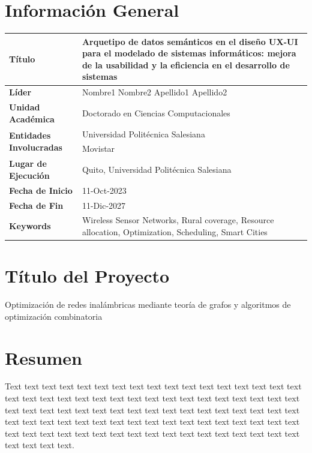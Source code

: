 \documentclass[12pt,a4paper]{article}
\begin{document}

\section{Información General}\label{sec:GeneralInformation}
\begin{table}[ht!]
\centering
\begin{tabular}{p{4cm}|p{9cm}}
\hline
\textbf{Título}  & 
Arquetipo de datos semánticos en el diseño UX-UI para el modelado de sistemas informáticos: mejora de la usabilidad y la eficiencia en el desarrollo de sistemas   \\
\hline
\textbf{Líder} & Nombre1 Nombre2 Apellido1 Apellido2 \\
\hline
\textbf{Unidad Académica} & Doctorado en Ciencias Computacionales \\
\hline
\multirow{2}{4cm}{\textbf{Entidades Involucradas}} & Universidad Politécnica Salesiana \\
& Movistar \\ \hline
\textbf{Lugar de Ejecución} & Quito, Universidad Politécnica Salesiana \\
\hline
\textbf{Fecha de Inicio} &   11-Oct-2023\\
\hline
\textbf{Fecha de Fin} &  11-Dic-2027 \\
\hline
\textbf{Keywords} & Wireless Sensor Networks, Rural coverage, Resource allocation, Optimization, Scheduling, Smart Cities \\
\hline
\end{tabular}
\end{table}
\section{Título del Proyecto}
Optimización de redes inalámbricas mediante teoría de grafos y algoritmos de optimización combinatoria
\section{Resumen}\label{sec:1}
Text text text text text text text text text text text text text text text text text text text text text text text text text text text text text text text text text text text text text text text text text text text text text text text text text text text text text text text text text text text text text text text text text text text text text text text text text text text text text text text text text text text text text text text text text.
\end{document}
